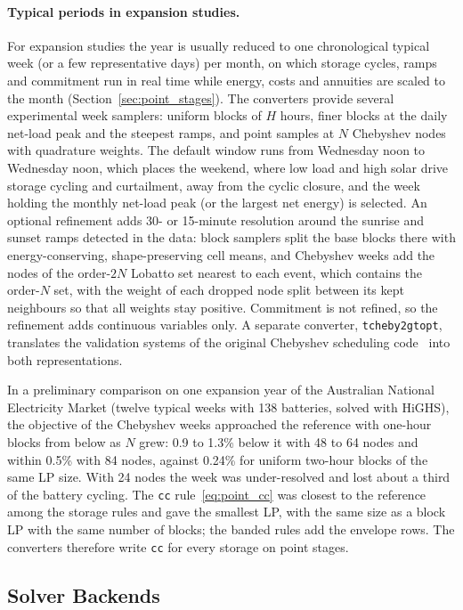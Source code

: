 \paragraph{Typical periods in expansion studies.}
For expansion studies the year is usually reduced to one chronological
typical week (or a few representative days) per month, on which
storage cycles, ramps and commitment run in real time while energy,
costs and annuities are scaled to the month (Section~\ref{sec:point_stages}).
The converters provide several experimental week samplers: uniform
blocks of $H$ hours, finer blocks at the daily net-load peak and the
steepest ramps, and point samples at $N$ Chebyshev nodes with
quadrature weights.  The default window runs from Wednesday noon to
Wednesday noon, which places the weekend, where low load and high solar
drive storage cycling and curtailment, away from the cyclic closure, and
the week holding the monthly net-load peak (or the largest net energy) is
selected.  An optional refinement adds 30- or 15-minute resolution
around the sunrise and sunset ramps detected in the data: block samplers
split the base blocks there with energy-conserving, shape-preserving
cell means, and Chebyshev weeks add the nodes of the order-$2N$
Lobatto set nearest to each event, which contains the order-$N$ set,
with the weight of each dropped node split between its kept
neighbours so that all weights stay positive.  Commitment is not
refined, so the refinement adds continuous variables only.  A separate
converter, \texttt{tcheby2gtopt}, translates the validation systems of
the original Chebyshev scheduling code~\cite{matus2015chebyshev} into
both representations.

In a preliminary comparison on one expansion year of the Australian
National Electricity Market (twelve typical weeks with 138 batteries,
solved with HiGHS), the objective of the Chebyshev weeks approached the
reference with one-hour blocks from below as $N$ grew: 0.9 to 1.3\% below
it with 48 to 64 nodes and within 0.5\% with 84 nodes, against 0.24\%
for uniform two-hour blocks of the same LP size.  With 24 nodes the
week was under-resolved and lost about a third of the battery cycling.  The \texttt{cc} rule~\eqref{eq:point_cc} was closest to the
reference among the storage rules and gave the smallest LP, with the
same size as a block LP with the same number of blocks; the banded
rules add the envelope rows.  The converters therefore write
\texttt{cc} for every storage on point stages.

\subsection{Solver Backends}

